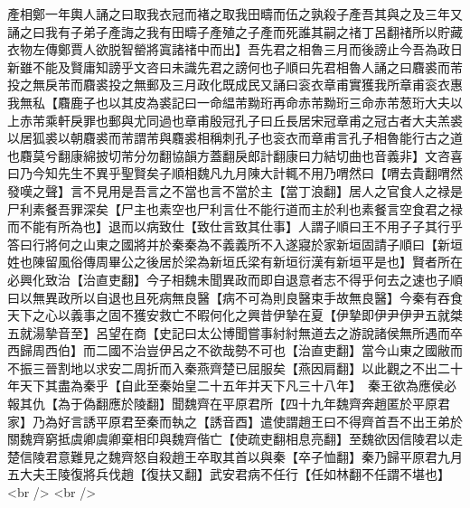 產相鄭一年輿人誦之曰取我衣冠而褚之取我田疇而伍之孰殺子產吾其與之及三年又誦之曰我有子弟子產誨之我有田疇子產殖之子產而死誰其嗣之禇丁呂翻禇所以貯藏衣物左傳鄭賈人欲脱智罃將寘諸禇中而出】吾先君之相魯三月而後謗止今吾為政日新雖不能及賢庸知謗乎文咨曰未識先君之謗何也子順曰先君相魯人誦之曰麛裘而芾投之無戾芾而麛裘投之無郵及三月政化既成民又誦曰衮衣章甫實獲我所章甫衮衣惠我無私【麛鹿子也以其皮為裘記曰一命緼芾黝珩再命赤芾黝珩三命赤芾葱珩大夫以上赤芾乘軒戾罪也郵與尤同過也章甫殷冠孔子曰丘長居宋冠章甫之冠古者大夫羔裘以居狐裘以朝麛裘而芾謂芾與麛裘相稱刺孔子也衮衣而章甫言孔子相魯能行古之道也麛莫兮翻康綿披切芾分勿翻協韻方蓋翻戾郎計翻康曰力結切曲也音義非】文咨喜曰乃今知先生不異乎聖賢矣子順相魏凡九月陳大計輒不用乃喟然曰【喟去貴翻喟然發嘆之聲】言不見用是吾言之不當也言不當於主【當丁浪翻】居人之官食人之禄是尸利素餐吾罪深矣【尸主也素空也尸利言仕不能行道而主於利也素餐言空食君之禄而不能有所為也】退而以病致仕【致仕言致其仕事】人謂子順曰王不用子子其行乎答曰行將何之山東之國將并於秦秦為不義義所不入遂寢於家新垣固請子順曰【新垣姓也陳留風俗傳周畢公之後居於梁為新垣氏梁有新垣衍漢有新垣平是也】賢者所在必興化致治【治直吏翻】今子相魏未聞異政而即自退意者志不得乎何去之速也子順曰以無異政所以自退也且死病無良醫【病不可為則良醫束手故無良醫】今秦有吞食天下之心以義事之固不獲安救亡不暇何化之興昔伊摯在夏【伊摯即伊尹伊尹五就桀五就湯摯音至】呂望在商【史記曰太公博聞嘗事紂紂無道去之游說諸侯無所遇而卒西歸周西伯】而二國不治豈伊呂之不欲哉勢不可也【治直吏翻】當今山東之國敝而不振三晉割地以求安二周折而入秦燕齊楚已屈服矣【燕因肩翻】以此觀之不出二十年天下其盡為秦乎【自此至秦始皇二十五年并天下凡三十八年】　秦王欲為應侯必報其仇【為于偽翻應於陵翻】聞魏齊在平原君所【四十九年魏齊奔趙匿於平原君家】乃為好言誘平原君至秦而執之【誘音酉】遣使謂趙王曰不得齊首吾不出王弟於關魏齊窮抵虞卿虞卿棄相印與魏齊偕亡【使疏吏翻相息亮翻】至魏欲因信陵君以走楚信陵君意難見之魏齊怒自殺趙王卒取其首以與秦【卒子恤翻】秦乃歸平原君九月五大夫王陵復將兵伐趙【復扶又翻】武安君病不任行【任如林翻不任謂不堪也】<br />
<br />
